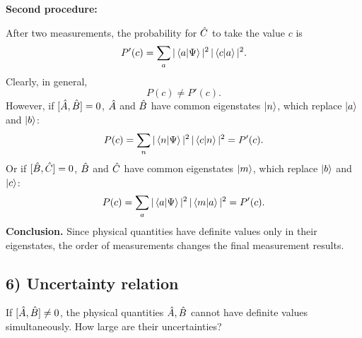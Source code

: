\textbf{Second procedure:}
\begin{center}\end{center}
After two measurements, the probability for $\hat{C}$ to take the value $c$ is
\begin{equation}
P'(c)=\sum_a |\left\langle a\middle|\Psi\right\rangle|^2\,|\left\langle c\middle|a\right\rangle|^2.
\end{equation}
Clearly, in general,
\begin{equation}
P(c)\ne P'(c).
\end{equation}
However, if $[\hat{A},\hat{B}]=0$, $\hat{A}$ and $\hat{B}$ have common eigenstates $\left|n\right\rangle$, which replace $\left|a\right\rangle$ and $\left|b\right\rangle$:
\begin{equation}
P(c)=\sum_n|\left\langle n\middle|\Psi\right\rangle|^2\,|\left\langle c\middle|n\right\rangle|^2=P'(c).
\end{equation}
Or if $[\hat{B},\hat{C}]=0$, $\hat{B}$ and $\hat{C}$ have common eigenstates $\left|m\right\rangle$, which replace $\left|b\right\rangle$ and $\left|c\right\rangle$:
\begin{equation}
P(c)=\sum_a|\left\langle a\middle|\Psi\right\rangle|^2\,|\left\langle m\middle|a\right\rangle|^2=P'(c).
\end{equation}
\textbf{Conclusion.} Since physical quantities have definite values only in their eigenstates, the order of measurements changes the final measurement results.
\subsection*{6) Uncertainty relation}
If $[\hat{A},\hat{B}]\ne0$, the physical quantities $\hat{A},\hat{B}$ cannot have definite values simultaneously. How large are their uncertainties?


